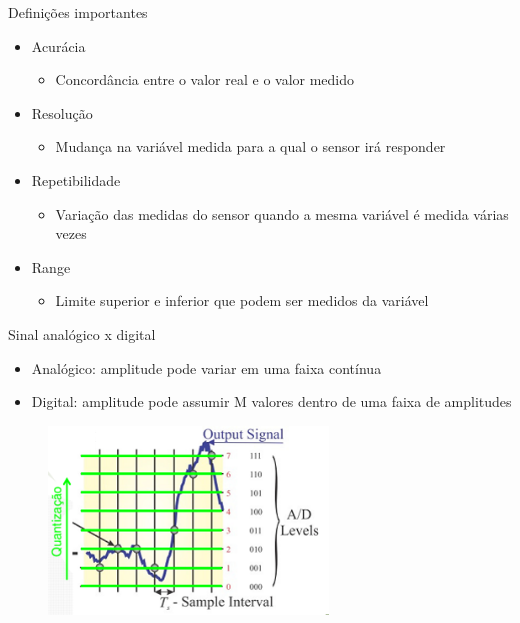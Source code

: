 \documentclass[aspectratio=169,
				xcolor=table]{beamer}
\begin{document}
		\begin{frame}{Definições importantes}
			\begin{itemize}
				\item Acurácia
				\begin{itemize}
					\item Concordância entre o valor real e o valor medido				
				\end{itemize}
				\vspace{.75em}
				\item Resolução 
				\begin{itemize}
					\item Mudança na variável medida para a qual o sensor irá responder				
				\end{itemize}
				\vspace{.75em}
				\item Repetibilidade
				\begin{itemize}
					\item Variação das medidas do sensor quando a mesma variável é medida várias vezes	
				\end{itemize}
				\vspace{.75em}
				\item Range
				\begin{itemize}
					\item Limite superior e inferior que podem ser medidos da variável			
				\end{itemize}
			\end{itemize}
		\end{frame}	
		
	
		\begin{frame}{Sinal analógico x digital}
			\begin{itemize}
				\item \alert{Analógico: }amplitude pode variar em uma faixa contínua
				\vspace{1em}
				\item \alert{Digital: }amplitude pode assumir M valores dentro de uma faixa de amplitudes
			\end{itemize}
			\begin{figure}
				\centering
				\includegraphics[height=5cm, keepaspectratio]{../figs/cap03/Imagem13}	
			\end{figure}
		\end{frame}
		
\end{document}
